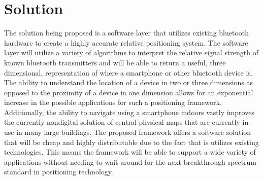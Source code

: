 \section{Solution}

The solution being proposed
is a software layer that utilizes existing bluetooth hardware to create a highly accurate relative positioning system.
The software layer will utilize a variety of algorithms to interpret the relative signal strength of known bluetooth transmitters
and will be able to return a useful, three dimensional, representation of where a smartphone or other bluetooth device is.
The ability to understand the location of a device in two or three dimensions as opposed to the proximity of a device in one
dimension allows for an exponential increase in the possible applications for such a positioning framework.  Additionally,
the ability to navigate using a smartphone indoors vastly improves the currently nondigital solution of central physical maps
that are currently in use in many large buildings.  The proposed framework offers a software solution that will be cheap and
highly distributable due to the fact that is utilizes existing technologies.  This means the framework will be able to support a
wide variety of applications without needing to wait around for the next breakthrough spectrum standard in positioning technology.
